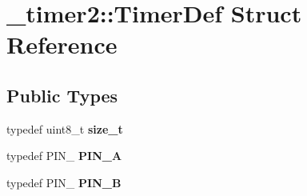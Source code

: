 \hypertarget{struct__timer2_1_1TimerDef}{}\section{\+\_\+timer2\+:\+:Timer\+Def Struct Reference}
\label{struct__timer2_1_1TimerDef}
\subsection*{Public Types}
\begin{DoxyCompactItemize}
\item 
typedef uint8\+\_\+t {\bfseries size\+\_\+t}\hypertarget{struct__timer2_1_1TimerDef_a4de2d0355f8365156f840b61eb29907d}{}\label{struct__timer2_1_1TimerDef_a4de2d0355f8365156f840b61eb29907d}

\item 
typedef P\+I\+N\+\_ {\bfseries P\+I\+N\+\_\+A}\hypertarget{struct__timer2_1_1TimerDef_acfaae68213dbf4d8e66001bdcfd4938c}{}\label{struct__timer2_1_1TimerDef_acfaae68213dbf4d8e66001bdcfd4938c}

\item 
typedef P\+I\+N\+\_ {\bfseries P\+I\+N\+\_\+B}\hypertarget{struct__timer2_1_1TimerDef_af4f3372005a05f2aa242f3d3fb942267}{}\label{struct__timer2_1_1TimerDef_af4f3372005a05f2aa242f3d3fb942267}

\end{DoxyCompactItemize}

